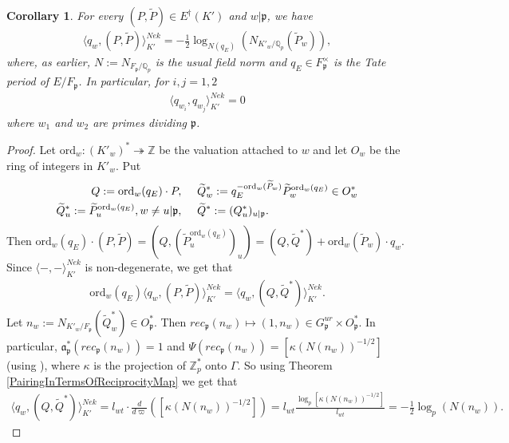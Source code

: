 \documentclass[reqno,10pt]{amsart}
\newcommand{\zp}{\mathbb{Z}_{p}}
\newcommand{\qp}{\mathbb{Q}_{p}}
\newcommand{\z}{\mathbb{Z}}
\newcommand{\ma}{\mathfrak{a}}
\newcommand{\p}{\mathfrak{p}}
\newcommand{\vp}{\varpi}
\newcommand{\tp}{\widetilde{P}}
\newcommand{\wq}{\widetilde{Q}}
\theoremstyle{plain}
\newtheorem{cor}[thm]{Corollary}
\theoremstyle{definition}
\begin{document}
\begin{cor} \label{PairingInTermsOfLog}
    For every $(P,\widetilde{P}) \in E^\dagger(K')$ and $w|\p$, we have
    \begin{align*}
        \langle q_w,(P,\widetilde{P}) \rangle^{Nek}_{K'} = -\frac{1}{2} \log_{N(q_E)}(N_{K'_w/\qp}(\widetilde{P}_w)),
    \end{align*}
    where, as earlier, $N := N_{F_\p/\qp}$ is the usual field norm and $q_E \in F_\p^\times$ is the Tate period of $E/F_\p$. In particular, for $i,j = 1,2$
    \begin{align*}
        \langle q_{w_i},q_{w_j} \rangle^{Nek}_{K'} = 0
    \end{align*}
    where $w_1$ and $w_2$ are primes dividing $\p$.
\end{cor}

\begin{proof}
     Let $\mathrm{ord}_w : (K'_w)^* \twoheadrightarrow \z$ be the valuation attached to $w$ and let $O_w$ be the ring of integers in $K'_w$. Put
    \begin{align*}
        Q := \mathrm{ord}_w(q_E) \cdot P, & \hspace{5mm} \widetilde{Q}_w^* := q_E^{-\mathrm{ord}_w(\tp_w)}\tp_w^{\mathrm{ord}_w(q_E)} \in O_w^* \\
        \widetilde{Q}_u^* := \tp_u^{\mathrm{ord}_w(q_E)}, w \neq u|\p, & \hspace{5mm} \wq^* := (Q_u^*)_{u|\p}.
    \end{align*}
    Then $\mathrm{ord}_w(q_E) \cdot (P,\tp) = (Q,(\tp_u^{\mathrm{ord}_w(q_E)})_u) = (Q,\wq^*) + \mathrm{ord}_w(\tp_w) \cdot q_w$. Since $\langle -,- \rangle^{Nek}_{K'}$ is non-degenerate, we get that
    \begin{align*}
        \mathrm{ord}_w(q_E) \langle q_w,(P,\widetilde{P}) \rangle^{Nek}_{K'} = \langle q_w,(Q,\wq^*) \rangle^{Nek}_{K'}.
    \end{align*}
     Let $n_w := N_{K'_w/F_\p}(\wq_w^*) \in O_\p^*$. Then $rec_\p(n_w) \mapsto (1,n_w) \in G_\p^{ur} \times O_\p^*$. In particular, $\ma_\p^*(rec_\p(n_w)) = 1$ and $\Psi(rec_\p(n_w)) = [\kappa(N(n_w))^{-1/2}]$ (using \cite[Equation 8.13]{MokExceptionalZero}), where $\kappa$ is the projection of $\zp^*$ onto $\Gamma$. So using Theorem \ref{PairingInTermsOfReciprocityMap} we get that
    \begin{align*}
        \langle q_w, (Q,\wq^*) \rangle^{Nek}_{K'} = l_{wt} \cdot \frac{d}{d\vp} ([\kappa(N(n_w))^{-1/2}]) = l_{wt} \frac{\log_p[\kappa(N(n_w))^{-1/2}]}{l_{wt}} = -\frac{1}{2} \log_p(N(n_w)).

\end{align*}
\end{proof}
\end{document}
